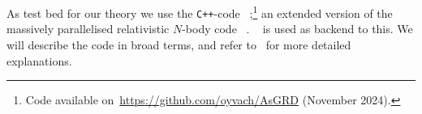 




















As test bed for our theory we use the \texttt{C++}-code \asgrd~\citep{christiansenGravitationalWavesDark2024};\footnote{Code available on~\url{https://github.com/oyvach/AsGRD} (November 2024).} an extended version of the massively parallelised relativistic $N$-body code \gevolution~\citep{adamekGeneralRelativityCosmic2016}. \latfield~\citep{daverioLatfield2LibraryClassical2016} is used as backend to this. %
We will describe the code in broad terms, and refer to~\citet{christiansenAsevolutionRelativisticNbody2023,christiansenAsimulationDomainFormation2024,adamekGevolutionCosmologicalNbody2016,christiansenGravitationalWavesDark2024,daverioLatfield2LibraryClassical2016} for more detailed explanations.

